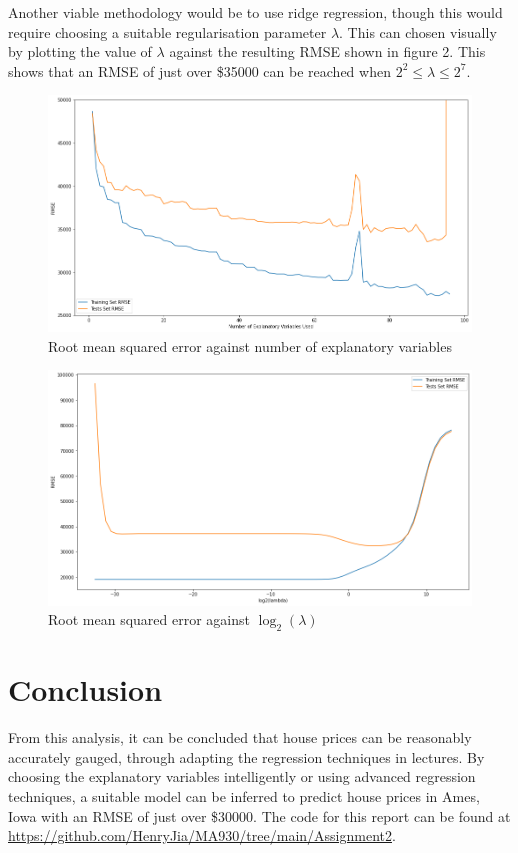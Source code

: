 \documentclass[11pt, twoside]{article}
\begin{document}
Another viable methodology would be to use ridge regression, though this would require choosing a suitable regularisation parameter $\lambda$. This can chosen visually by plotting the value of $\lambda$ against the resulting RMSE shown in figure 2. This shows that an RMSE of just over \$35000 can be reached when $2^2 \leq \lambda \leq 2^7$.

\begin{figure}[H]
\includegraphics[width=12cm]{corr1}
\centering
\caption{Root mean squared error against number of explanatory variables}
\end{figure}

\begin{figure}[H]
\includegraphics[width=12cm]{ridge}
\centering
\caption{Root mean squared error against $\log_2(\lambda)$}
\end{figure}

\section{Conclusion}

From this analysis, it can be concluded that house prices can be reasonably accurately gauged, through adapting the regression techniques in lectures. By choosing the explanatory variables intelligently or using advanced regression techniques, a suitable model can be inferred to predict house prices in Ames, Iowa with an RMSE of just over \$30000. The code for this report can be found at \url{https://github.com/HenryJia/MA930/tree/main/Assignment2}.
\end{document}
